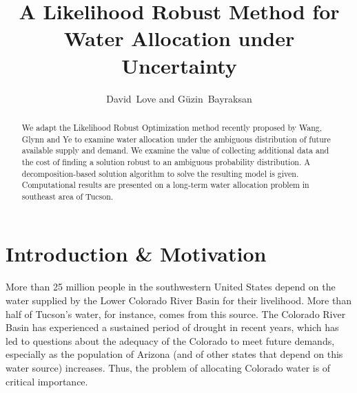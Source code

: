 \documentclass[11pt]{article}
\author{David~Love and G\"{u}zin~Bayraksan}
\title{A Likelihood Robust Method for Water Allocation under Uncertainty}
\date{}
\begin{document}
\maketitle

\begin{abstract}
	We adapt the Likelihood Robust Optimization method recently proposed by Wang, Glynn and Ye to examine water allocation under the ambiguous distribution of future available supply and demand. We examine the value of collecting additional data and the cost of finding a solution robust to an ambiguous probability distribution. A decomposition-based solution algorithm to solve the resulting model is given. Computational results are presented on a long-term water allocation problem in southeast area of Tucson.
\end{abstract}

\section{Introduction \& Motivation}


More than 25 million people in the southwestern United States depend on the water supplied by the Lower Colorado River Basin for their livelihood. More than half of Tucson's water, for instance, comes from this source. The Colorado River Basin has experienced a sustained period of drought in recent years, which has led to questions about the adequacy of the Colorado to meet future demands, especially as the population of Arizona (and of other states that depend on this water source) increases. Thus, the problem of allocating Colorado water is of critical importance. 
 
\end{document}
